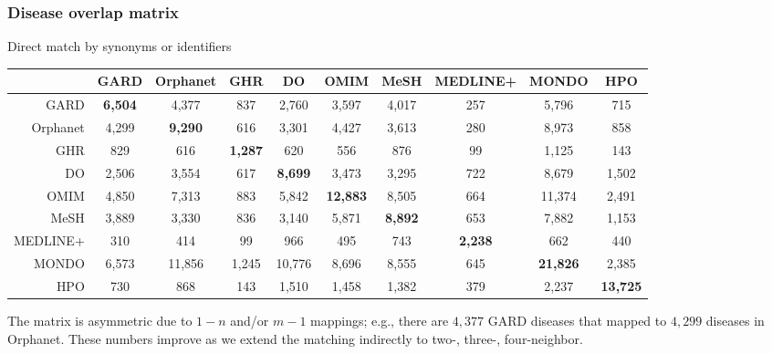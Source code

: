 ﻿\documentclass[anchorcolor=blue,linkcolor=blue]{beamer}
\begin{document}
\begin{frame}
  \frametitle{Disease overlap matrix}
  \begin{block}{Direct match by synonyms or identifiers}
    \begin{center}
      \tiny
      \begin{tabular}{rccccccccc}\toprule
        & GARD & Orphanet & GHR & DO & OMIM & MeSH & MEDLINE+&MONDO & HPO\\ \midrule
        GARD & \textbf{6,504}&4,377&837&2,760&3,597&4,017&257&5,796&715\\
        Orphanet &4,299&\textbf{9,290}&616&3,301&4,427&3,613&280&8,973&858\\
        GHR &829&616&\textbf{1,287}&620&556&876&99&1,125&143\\
        DO &2,506&3,554&617&\textbf{8,699}&3,473&3,295&722&8,679&1,502\\
        OMIM &4,850&7,313&883&5,842&\textbf{12,883}&8,505&664&11,374&2,491\\
        MeSH &3,889&3,330&836&3,140&5,871&\textbf{8,892}&653&7,882&1,153\\
        MEDLINE+ &310&414&99&966&495&743&\textbf{2,238}&662&440\\
        MONDO &6,573&11,856&1,245&10,776&8,696&8,555&645&\textbf{21,826}&2,385\\
        HPO &730&868&143&1,510&1,458&1,382&379&2,237&\textbf{13,725}\\ \bottomrule
      \end{tabular}
    \end{center}
    The matrix is asymmetric due to $1-n$ and/or $m-1$ mappings; e.g.,
    there are $4,377$ GARD diseases that mapped to $4,299$ diseases in
    Orphanet. These numbers improve as we extend the
    matching indirectly to two-, three-, four-neighbor.
  \end{block}
\end{frame}

\end{document}
